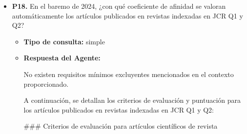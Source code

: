 \documentclass{article}
\begin{document}
\begin{itemize}
\begin{itemize}
                        \#\#\# Ponderación del apartado de actividad investigadora:
                        - La actividad investigadora tiene una ponderación del \textbf{35\%} en la evaluación global para la plaza de Profesor Ayudante Doctor, según la Tabla 1 de ponderaciones.

                        \#\#\# Máximo de puntos en el apartado de actividad investigadora:
                        - El máximo de puntos que se puede conseguir en este apartado es \textbf{100 puntos}, considerando todos los criterios de evaluación mencionados.

                        En resumen, el máximo de puntos que puedes conseguir en el apartado de actividad investigadora para la plaza de Profesor Ayudante Doctor es \textbf{100 puntos}, distribuidos según los criterios de evaluación y las ponderaciones establecidas en el baremo de 2024.
                  \item \textbf{Contexto utilizado:}

            \end{itemize}

      \item \textbf{P18.} En el baremo de 2024, ¿con qué coeficiente de afinidad se valoran automáticamente los artículos publicados en revistas indexadas en JCR Q1 y Q2? \\
            \begin{itemize}
                  \item \textbf{Tipo de consulta:} simple
                  \item \textbf{Respuesta del Agente:}

                        No existen requisitos mínimos excluyentes mencionados en el contexto proporcionado.

                        A continuación, se detallan los criterios de evaluación y puntuación para los artículos publicados en revistas indexadas en JCR Q1 y Q2:

                        \#\#\# Criterios de evaluación para artículos científicos de revista


\end{itemize}
\end{itemize}
\end{document}
